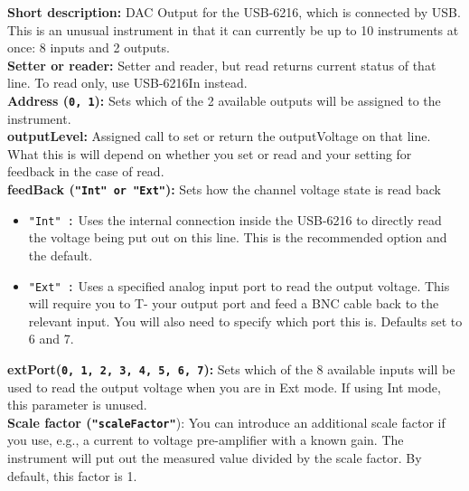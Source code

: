 \textbf{\textsf{Short description}:} DAC Output for the USB-6216, which is connected by USB. This is an unusual instrument in that it can currently be up to 10 instruments at once: 8 inputs and 2 outputs.\\
\textbf{\textsf{Setter or reader}:} Setter and reader, but read returns current status of that line. To read only, use USB-6216In instead.\\
\textbf{\textsf{Address} (\texttt{0, 1}):} Sets which of the 2 available outputs will be assigned to the instrument.\\
\textbf{\textsf{outputLevel}:} Assigned call to set or return the outputVoltage on that line. What this is will depend on whether you set or read and your setting for feedback in the case of read.\\
\textbf{\textsf{feedBack} (\texttt{"Int" or "Ext"}):} Sets how the channel voltage state is read back\\
\begin{itemize}[noitemsep]
\item \texttt{"Int" :} Uses the internal connection inside the USB-6216 to directly read the voltage being put out on this line. This is the recommended option and the default.
\item \texttt{"Ext" :} Uses a specified analog input port to read the output voltage. This will require you to T- your output port and feed a BNC cable back to the relevant input. You will also need to specify which port this is. Defaults set to 6 and 7.
\end{itemize}
\textbf{\textsf{extPort}(\texttt{0, 1, 2, 3, 4, 5, 6, 7}):} Sets which of the 8 available inputs will be used to read the output voltage when you are in Ext mode. If using Int mode, this parameter is unused.\\
\textbf{\textsf{Scale factor} (\texttt{"scaleFactor"}}): You can introduce an additional scale factor if you use, e.g., a current to voltage pre-amplifier with a known gain. The instrument will put out the measured value divided by the scale factor. By default, this factor is 1.\\ 